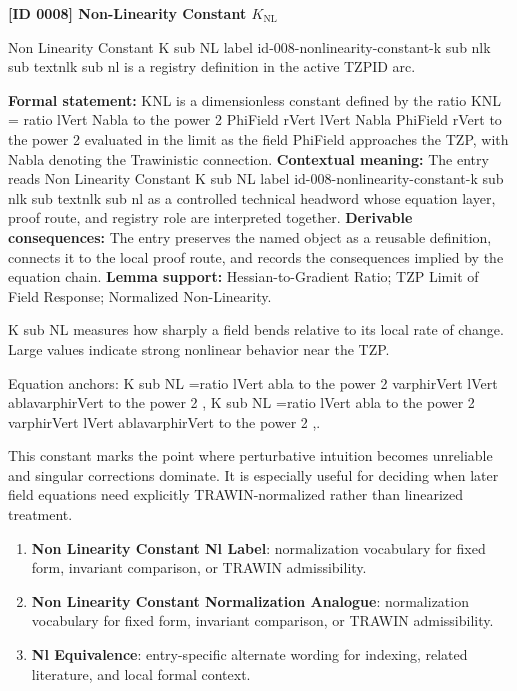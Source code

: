 \clearpage
\noindent\textbf{[ID 0008] Non-Linearity Constant $K_{\mathrm{NL}}$}\par
\vspace{0.35em}
\begingroup\small
{}
Non Linearity Constant K sub NL label id-008-nonlinearity-constant-k sub nlk sub textnlk sub nl is a registry definition in the active TZPID arc.

\begingroup\footnotesize\setlength{\emergencystretch}{3em}\sloppy
\textbf{Formal statement:} KNL is a dimensionless constant defined by the ratio KNL = ratio lVert Nabla to the power 2 PhiField rVert lVert Nabla PhiField rVert to the power 2 evaluated in the limit as the field PhiField approaches the TZP, with Nabla denoting the Trawinistic connection. \textbf{Contextual meaning:} The entry reads Non Linearity Constant K sub NL label id-008-nonlinearity-constant-k sub nlk sub textnlk sub nl as a controlled technical headword whose equation layer, proof route, and registry role are interpreted together. \textbf{Derivable consequences:} The entry preserves the named object as a reusable definition, connects it to the local proof route, and records the consequences implied by the equation chain. \textbf{Lemma support:} Hessian-to-Gradient Ratio; TZP Limit of Field Response; Normalized Non-Linearity.\par
\endgroup

K sub NL measures how sharply a field bends relative to its local rate of change. Large values indicate strong nonlinear behavior near the TZP.

Equation anchors: K sub NL =ratio lVert abla to the power 2 varphirVert lVert ablavarphirVert to the power 2 , K sub NL =ratio lVert abla to the power 2 varphirVert lVert ablavarphirVert to the power 2 ,.

This constant marks the point where perturbative intuition becomes unreliable and singular corrections dominate. It is especially useful for deciding when later field equations need explicitly TRAWIN-normalized rather than linearized treatment.
\endgroup

\begingroup\footnotesize\sloppy
\begin{enumerate}[leftmargin=1.35em,itemsep=1pt,topsep=1pt,parsep=0pt]
\item \textbf{Non Linearity Constant Nl Label}: normalization vocabulary for fixed form, invariant comparison, or TRAWIN admissibility.
\item \textbf{Non Linearity Constant Normalization Analogue}: normalization vocabulary for fixed form, invariant comparison, or TRAWIN admissibility.
\item \textbf{Nl Equivalence}: entry-specific alternate wording for indexing, related literature, and local formal context.
\end{enumerate}
\endgroup

